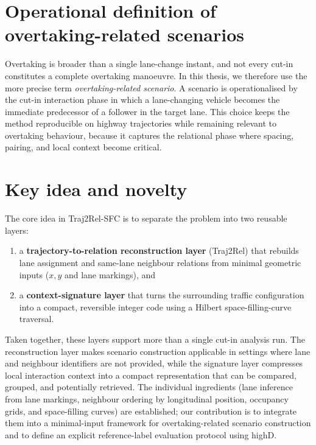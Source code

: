 \documentclass[12pt,a4paper,twoside,openright]{report}
\newcommand{\FrameworkName}{Traj2Rel-SFC}
\begin{document}
    \section{Operational definition of overtaking-related scenarios}
    Overtaking is broader than a single lane-change instant, and not every cut-in constitutes a complete overtaking manoeuvre. In this thesis, we therefore use the more precise term \emph{overtaking-related scenario}. A scenario is operationalised by the cut-in interaction phase in which a lane-changing vehicle becomes the immediate predecessor of a follower in the target lane. This choice keeps the method reproducible on highway trajectories while remaining relevant to overtaking behaviour, because it captures the relational phase where spacing, pairing, and local context become critical.

    \section{Key idea and novelty}
    The core idea in \FrameworkName{} is to separate the problem into two reusable layers:

    \begin{enumerate}[leftmargin=1.6em]
  \item a \textbf{trajectory-to-relation reconstruction layer} (Traj2Rel) that rebuilds lane assignment and same-lane neighbour relations from minimal geometric inputs ($x,y$ and lane markings), and
  \item a \textbf{context-signature layer} that turns the surrounding traffic configuration into a compact, reversible integer code using a Hilbert space-filling-curve traversal.
    \end{enumerate}

    Taken together, these layers support more than a single cut-in analysis run. The reconstruction layer makes scenario construction applicable in settings where lane and neighbour identifiers are not provided, while the signature layer compresses local interaction context into a compact representation that can be compared, grouped, and potentially retrieved. The individual ingredients (lane inference from lane markings, neighbour ordering by longitudinal position, occupancy grids, and space-filling curves) are established; our contribution is to integrate them into a minimal-input framework for overtaking-related scenario construction and to define an explicit reference-label evaluation protocol using highD.
\end{document}
